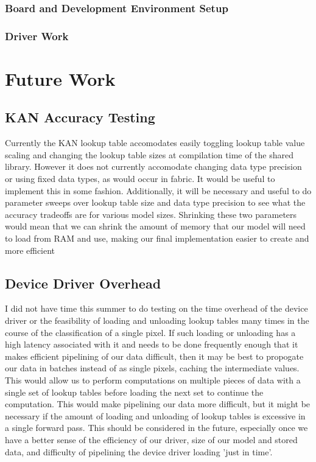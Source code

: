 \documentclass{article}
\begin{document}

\subsubsection{Board and Development Environment Setup}

\subsubsection{Driver Work} %


\section{Future Work}
\subsection{KAN Accuracy Testing}
Currently the KAN lookup table accomodates easily toggling lookup table value scaling and changing the lookup table sizes at compilation time of the shared library. However it does not currently accomodate changing data type precision or using fixed data types, as would occur in fabric. It would be useful to implement this in some fashion. Additionally, it will be necessary and useful to do parameter sweeps over lookup table size and data type precision to see what the accuracy tradeoffs are for various model sizes. Shrinking these two parameters would mean that we can shrink the amount of memory that our model will need to load from RAM and use, making our final implementation easier to create and more efficient

\subsection{Device Driver Overhead}
I did not have time this summer to do testing on the time overhead of the device driver or the feasibility of loading and unloading lookup tables many times in the course of the classification of a single pixel. If such loading or unloading has a high latency associated with it and needs to be done frequently enough that it makes efficient pipelining of our data difficult, then it may be best to propogate our data in batches instead of as single pixels, caching the intermediate values. This would allow us to perform computations on multiple pieces of data with a single set of lookup tables before loading the next set to continue the computation. This would make pipelining our data more difficult, but it might be necessary if the amount of loading and unloading of lookup tables is excessive in a single forward pass. This should be considered in the future, especially once we have a better sense of the efficiency of our driver, size of our model and stored data, and difficulty of pipelining the device driver loading 'just in time'.
\end{document}
